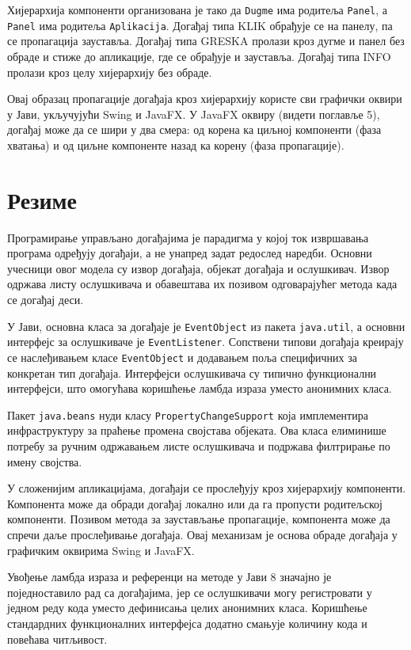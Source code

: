 Хијерархија компоненти организована је тако да \texttt{Dugme} има родитеља \texttt{Panel}, а \texttt{Panel} има родитеља \texttt{Aplikacija}. Догађај типа KLIK обрађује се на панелу, па се пропагација зауставља. Догађај типа GRESKA пролази кроз дугме и панел без обраде и стиже до апликације, где се обрађује и зауставља. Догађај типа INFO пролази кроз целу хијерархију без обраде.

Овај образац пропагације догађаја кроз хијерархију користе сви графички оквири у Јави, укључујући Swing и JavaFX. У JavaFX оквиру (видети поглавље 5), догађај може да се шири у два смера: од корена ка циљној компоненти (фаза хватања) и од циљне компоненте назад ка корену (фаза пропагације).

\section{Резиме}

Програмирање управљано догађајима је парадигма у којој ток извршавања програма одређују догађаји, а не унапред задат редослед наредби. Основни учесници овог модела су извор догађаја, објекат догађаја и ослушкивач. Извор одржава листу ослушкивача и обавештава их позивом одговарајућег метода када се догађај деси.

У Јави, основна класа за догађаје је \texttt{EventObject} из пакета \texttt{java.util}, а основни интерфејс за ослушкиваче је \texttt{EventListener}. Сопствени типови догађаја креирају се наслеђивањем класе \texttt{EventObject} и додавањем поља специфичних за конкретан тип догађаја. Интерфејси ослушкивача су типично функционални интерфејси, што омогућава коришћење ламбда израза уместо анонимних класа.

Пакет \texttt{java.beans} нуди класу \texttt{PropertyChangeSupport} која имплементира инфраструктуру за праћење промена својстава објеката. Ова класа елиминише потребу за ручним одржавањем листе ослушкивача и подржава филтрирање по имену својства.

У сложенијим апликацијама, догађаји се прослеђују кроз хијерархију компоненти. Компонента може да обради догађај локално или да га пропусти родитељској компоненти. Позивом метода за заустављање пропагације, компонента може да спречи даље прослеђивање догађаја. Овај механизам је основа обраде догађаја у графичким оквирима Swing и JavaFX.

Увођење ламбда израза и референци на методе у Јави 8 значајно је поједноставило рад са догађајима, јер се ослушкивачи могу регистровати у једном реду кода уместо дефинисања целих анонимних класа. Коришћење стандардних функционалних интерфејса додатно смањује количину кода и повећава читљивост.


